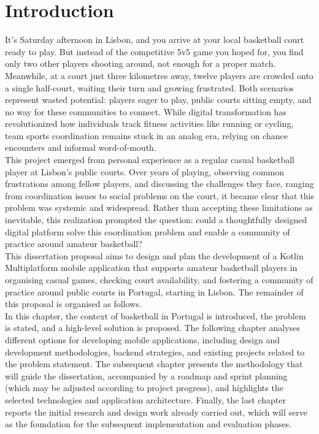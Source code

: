 \chapter{Introduction}
\label{ch:introduction}

\begin{introduction}
	
	It's Saturday afternoon in Lisbon, and you arrive at your local basketball court ready to play. But instead of the competitive 5v5 game you hoped for, you find only two other players shooting around, not enough for a proper match. Meanwhile, at a court just three kilometres away, twelve players are crowded onto a single half-court, waiting their turn and growing frustrated. Both scenarios represent wasted potential: players eager to play, public courts sitting empty, and no way for these communities to connect. While digital transformation has revolutionized how individuals track fitness activities like running or cycling, team sports coordination remains stuck in an analog era, relying on chance encounters and informal word-of-mouth.\\
	This project emerged from personal experience as a regular casual basketball player at Lisbon's public courts. Over years of playing, observing common frustrations among fellow players, and discussing the challenges they face, ranging from coordination issues to social problems on the court, it became clear that this problem was systemic and widespread. Rather than accepting these limitations as inevitable, this realization prompted the question: could a thoughtfully designed digital platform solve this coordination problem and enable a community of practice around amateur basketball?\\
	This dissertation proposal aims to design and plan the development of a Kotlin Multiplatform mobile application that supports amateur basketball players in organising casual games, checking court availability, and fostering a community of practice around public courts in Portugal, starting in Lisbon. The remainder of this proposal is organised as follows.\\
	In this chapter, the context of basketball in Portugal is introduced, the problem is stated, and a high-level solution is proposed. The following chapter analyses different options for developing mobile applications, including design and development methodologies, backend strategies, and existing projects related to the problem statement. The subsequent chapter presents the methodology that will guide the dissertation, accompanied by a roadmap and sprint planning (which may be adjusted according to project progress), and highlights the selected technologies and application architecture. Finally, the last chapter reports the initial research and design work already carried out, which will serve as the foundation for the subsequent implementation and evaluation phases.
	
\end{introduction}

